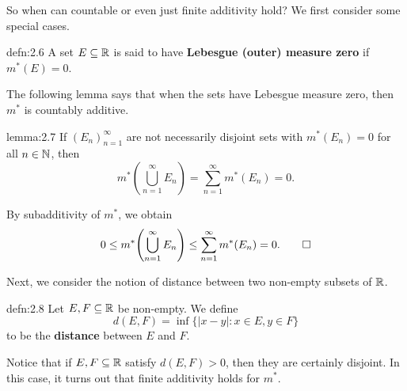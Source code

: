 So when can countable or even just finite additivity hold? 
We first consider some special cases. 

\begin{defn}{defn:2.6}
    A set $E \subseteq \mathbb{R}$ is said to have {\bf Lebesgue (outer) measure 
    zero} if $m^*(E) = 0$.
\end{defn}

The following lemma says that when the sets have Lebesgue measure zero, 
then $m^*$ is countably additive. 

\begin{lemma}{lemma:2.7}
    If $(E_n)_{n=1}^\infty$ are not necessarily disjoint sets with 
    $m^*(E_n) = 0$ for all $n \in \mathbb{N}$, then 
    \[ m^*\!\left( \bigcup_{n=1}^\infty E_n \right) = 
    \sum_{n=1}^\infty m^*(E_n) = 0. \] 
\end{lemma}
\begin{pf}
    By subadditivity of $m^*$, we obtain 
    \[ 0 \leq m^*\!\left( \bigcup_{n=1}^\infty E_n \right) \leq 
    \sum_{n=1}^\infty m^*(E_n) = 0. \qedhere \] 
\end{pf}

Next, we consider the notion of distance between two non-empty subsets of $\mathbb{R}$.

\begin{defn}{defn:2.8}
    Let $E, F \subseteq \mathbb{R}$ be non-empty. We define 
    \[ d(E, F) = \inf\{|x - y| : x\in E, y\in F\} \] 
    to be the {\bf distance} between $E$ and $F$. 
\end{defn}

Notice that if $E, F \subseteq \mathbb{R}$ satisfy $d(E, F) > 0$, then they are 
certainly disjoint. In this case, it turns out that finite additivity holds
for $m^*$.

